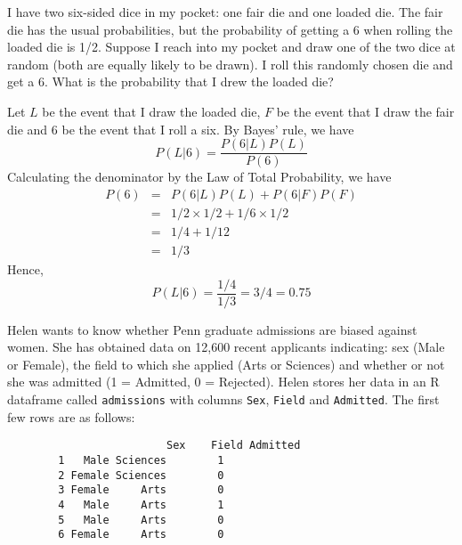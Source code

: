 \documentclass[addpoints,12pt]{exam}
\begin{document}
\begin{questions}
\question[10] I have two six-sided dice in my pocket: one fair die and one loaded die. The fair die has the usual probabilities, but the probability of getting a 6 when rolling the loaded die is 1/2. Suppose I reach into my pocket and draw one of the two dice at random (both are equally likely to be drawn). I roll this randomly chosen die and get a 6. What is the probability that I drew the loaded die? 
	\begin{solution}[2.25in]
		Let $L$ be the event that I draw the loaded die, $F$ be the event that I draw the fair die and $6$ be the event that I roll a six. By Bayes' rule, we have
			$$P(L|6) = \frac{P(6|L)P(L)}{P(6)}$$
Calculating the denominator by the Law of Total Probability, we have
		\begin{eqnarray*}			
			P(6) &=& P(6|L)P(L) + P(6|F)P(F) \\
			&=& 1/2 \times 1/2 + 1/6\times 1/2\\
			&=&	1/4 + 1/12 \\
			&=& 1/3		
			\end{eqnarray*}
		Hence,
			$$P(L|6) = \frac{1/4}{1/3} = 3/4 = 0.75$$
	\end{solution}
	
	



\question Helen wants to know whether Penn graduate admissions are biased against women. She has obtained data on 12,600 recent applicants indicating: sex (Male or Female), the field to which she applied (Arts or Sciences) and whether or not she was admitted (1 = Admitted, 0 = Rejected). Helen stores her data in an R dataframe called \texttt{admissions} with columns \texttt{Sex}, \texttt{Field} and \texttt{Admitted}. The first few rows are as follows:
			\begin{verbatim}
					     Sex    Field Admitted
		1   Male Sciences        1
		2 Female Sciences        0
		3 Female     Arts        0
		4   Male     Arts        1
		5   Male     Arts        0
		6 Female     Arts        0
			\end{verbatim}
\end{questions}
\end{document}
